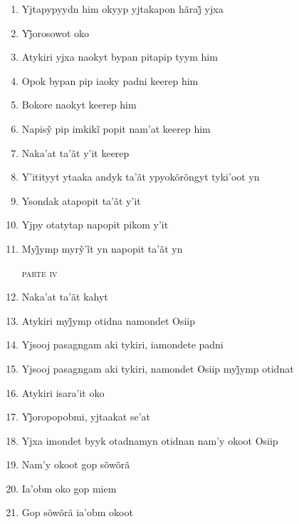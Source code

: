 \begin{enumerate}
 \begin{center}\end{center}
 
 \item Yjtapypyydn him okyyp yjtakapon hãraj̃ yjxa
 \item Yj̃orosowot oko
 \item Atykiri yjxa naokyt bypan pitapip tyym him
 \item Opok bypan pip iaoky padni keerep him
 \item Bokore naokyt keerep him
 \item Napisỹ pip imkikĩ popit nam’at keerep him
 
 \begin{center}\end{center}
 
 \item Naka'at ta'ãt y'it keerep
 \item Y'itityyt ytaaka andyk ta'ãt ypyokõrõngyt tyki'oot yn
 \item Ysondak atapopit ta'ãt y'it
 \item Yjpy otatytap napopit pikom y'it
 \item Myj̃ymp myrỹ’ĩt yn napopit ta’ãt yn
 
 \begin{flushright}\textsc{parte iv}\end{flushright}
 
 \item Naka'at ta'ãt kahyt
 \item Atykiri myj̃ymp otidna namondet Osiip
 \item Yjsooj pasagngam aki tykiri, iamondete padni
 \item Yjsooj pasagngam aki tykiri, namondet Osiip myj̃ymp otidnat
 \item Atykiri isara'it oko
 \item Yj̃oropopobmi, yjtaakat se’at
 
 \begin{center}\end{center}
 
 \item Yjxa imondet byyk otadnamyn otidnan nam'y okoot Osiip
 \item Nam'y okoot gop sõwõrã
 \item Ia'obm oko gop miem
 \item Gop sõwõrã ia'obm okoot
 
 \begin{center}\end{center}
 

\end{enumerate}
